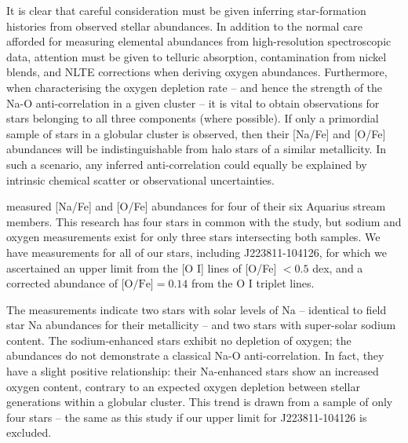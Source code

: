 \documentclass{emulateapj}
\begin{document}
It is clear that careful consideration must be given inferring star-formation histories from observed stellar abundances. In addition to the normal care afforded for measuring elemental abundances from high-resolution spectroscopic data, attention must be given to telluric absorption, contamination from nickel blends, and NLTE corrections when deriving oxygen abundances. Furthermore, when characterising the oxygen depletion rate -- and hence the strength of the Na-O anti-correlation in a given cluster -- it is vital to obtain observations for stars belonging to all three components (where possible). If only a primordial sample of stars in a globular cluster is observed, then their [Na/Fe] and [O/Fe] abundances will be indistinguishable from halo stars of a similar metallicity. In such a scenario, any inferred anti-correlation could equally be explained by intrinsic chemical scatter or observational uncertainties.


\citet{wylie-de-boer;et-al_2012} measured [Na/Fe] and [O/Fe] abundances for four of their six Aquarius stream members. This research has four stars in common with the \citet{wylie-de-boer;et-al_2012} study, but sodium and oxygen measurements exist for only three stars intersecting both samples. We have measurements for all of our stars, including J223811-104126, for which we ascertained an upper limit from the [O \textsc{I}] lines of [O/Fe] $< 0.5$ dex, and a corrected abundance of $\mbox{[O/Fe]} = 0.14$ from the O \textsc{I} triplet lines.



The \citet{wylie-de-boer;et-al_2012} measurements indicate two stars with solar levels of Na -- identical to field star Na abundances for their metallicity -- and two stars with super-solar sodium content. The sodium-enhanced stars exhibit no depletion of oxygen; the abundances do not demonstrate a classical Na-O anti-correlation. In fact, they have a slight positive relationship: their Na-enhanced stars show an increased oxygen content, contrary to an expected oxygen depletion between stellar generations within a globular cluster. This trend is drawn from a sample of only four stars -- the same as this study if our upper limit for J223811-104126 is excluded. 

\end{document}
